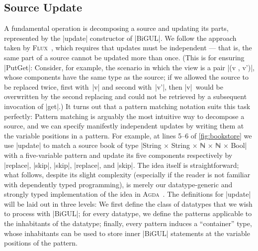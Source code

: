 \documentclass{sigplanconf}
\newcommand{\Agda}{\textsc{Agda}}
\begin{document}
\subsection{Source Update}
\label{sec:source-update}

A fundamental operation is decomposing a source and updating its parts, represented by the |update| constructor of |BiGUL|.
We follow the approach taken by \textsc{Flux}~\cite{Cheney-FLUX}, which requires that updates must be independent --- that is, the same part of a source cannot be updated more than once.
(This is for ensuring |PutGet|: Consider, for example, the scenario in which the view is a pair |(v , v')|, whose components have the same type as the source; if we allowed the source to be replaced twice, first with~|v| and second with~|v'|, then |v|~would be overwritten by the second replacing and could not be retrieved by a subsequent invocation of |get|.)
It turns out that a pattern matching notation suits this task perfectly: Pattern matching is arguably the most intuitive way to decompose a source, and we can specify manifestly independent updates by writing them at the variable positions in a pattern.
For example, at lines 5--6 of \autoref{fig:bookstore} we use |update| to match a source book of type |String × String × ℕ × ℕ × Bool| with a five-variable pattern and update its five components respectively by |replace|, |skip|, |skip|, |replace|, and |skip|.
The idea itself is straightforward; what follows, despite its slight complexity (especially if the reader is not familiar with dependently typed programming), is merely our datatype-generic and strongly typed implementation of the idea in \Agda~\cite{Gibbons-DGP,Altenkirch-GP-within-DTP}.
The definitions for |update| will be laid out in three levels:
We first define the class of datatypes that we wish to process with |BiGUL|; for every datatype, we define the patterns applicable to the inhabitants of the datatype; finally, every pattern induces a ``container'' type, whose inhabitants can be used to store inner |BiGUL| statements at the variable positions of the pattern.
\end{document}
